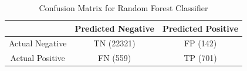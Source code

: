 \begin{table}[h]
\centering
\begin{tabular}{|c|c|c|}
\hline
 & Predicted Negative & Predicted Positive \\
\hline
Actual Negative & TN (22321) & FP (142) \\
\hline
Actual Positive & FN (559) & TP (701) \\
\hline
\end{tabular}
\caption{Confusion Matrix for Random Forest Classifier}
\end{table}